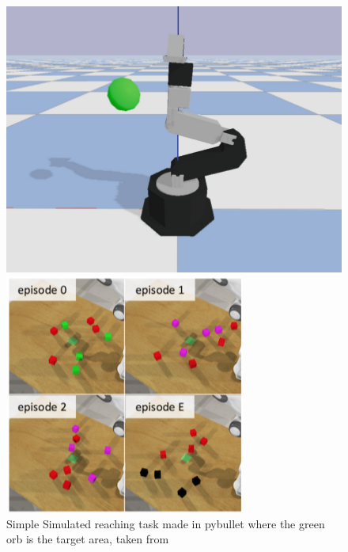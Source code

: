 \begin{figure}[h]
  \centering
  \begin{minipage}{0.32\textwidth}
    \centering
    \includegraphics[width=\textwidth]{assets/eval-plan/reach-sim.png}
    \caption{Simple Simulated reaching task made in pybullet where the green orb is the target area, taken from \cite{aumjaud2020reinforcement}}
  \end{minipage}
  \hfill
  \begin{minipage}{0.32\textwidth}
      \centering
      \includegraphics[width=\textwidth]{assets/eval-plan/grasp-sim.png}

\end{minipage}
\end{figure}

